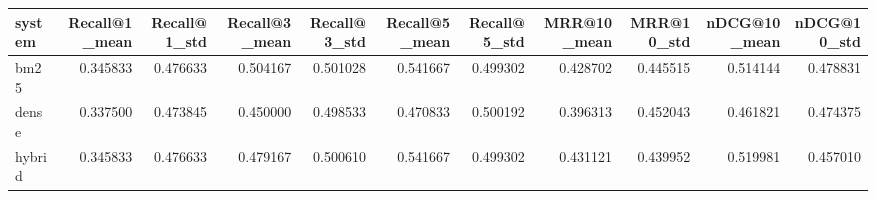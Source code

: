 \begin{tabular}{lrrrrrrrrrr}
\toprule
system & Recall@1_mean & Recall@1_std & Recall@3_mean & Recall@3_std & Recall@5_mean & Recall@5_std & MRR@10_mean & MRR@10_std & nDCG@10_mean & nDCG@10_std \\
\midrule
bm25 & 0.345833 & 0.476633 & 0.504167 & 0.501028 & 0.541667 & 0.499302 & 0.428702 & 0.445515 & 0.514144 & 0.478831 \\
dense & 0.337500 & 0.473845 & 0.450000 & 0.498533 & 0.470833 & 0.500192 & 0.396313 & 0.452043 & 0.461821 & 0.474375 \\
hybrid & 0.345833 & 0.476633 & 0.479167 & 0.500610 & 0.541667 & 0.499302 & 0.431121 & 0.439952 & 0.519981 & 0.457010 \\
\bottomrule
\end{tabular}

